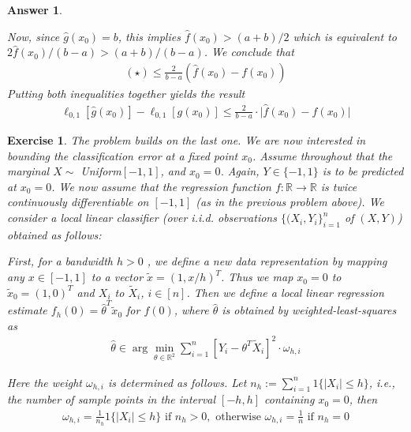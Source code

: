 \documentclass[12pt]{article}
\theoremstyle{colon}
\newtheorem{exercise}{Exercise}
\newtheorem*{answer}{Answer}
\begin{document}
\begin{answer}
\begin{enumerate}[label=\arabic*)]
      Now, since $\widehat{g}(x_0) = b$, this implies $\widehat{f}(x_0) > (a+b)/2$ which is equivalent to $2\widehat{f}(x_0)/(b-a) > (a+b)/(b-a)$. We conclude that
      \begin{gather*}
        (\star) \leq \frac{2}{b-a} (\widehat{f}(x_0) - f(x_0))
      \end{gather*}
      Putting both inequalities together yields the result
      \begin{gather*}
        \ell_{0,1}[\widehat{g}(x_0)] - \ell_{0,1}[g(x_0)] \leq \frac{2}{b-a} \cdot \lvert \widehat{f}(x_0) - f(x_0) \rvert
      \end{gather*}
  \end{enumerate}
\end{answer}

\clearpage

\begin{exercise}
  The problem builds on the last one. We are now interested in bounding the classification error at a fixed point $x_0$. Assume throughout that the marginal $X \sim$ Uniform$[-1,1]$, and $x_0 = 0$. Again, $Y \in \{-1, 1\}$ is to be predicted at $x_0 = 0$. We now assume that the regression function $f: \mathbb{R} \rightarrow \mathbb{R}$ is twice continuously differentiable on $[-1,1]$ (as in the previous problem above). We consider a \textit{local linear} classifier (over i.i.d. observations $\{(X_i, Y_i\}_{i=1}^n$ of $(X,Y)$) obtained as follows:

  First, for a bandwidth $h > 0$ , we define a new data representation by mapping any $x \in [-1,1]$ to a vector $\tilde{x} = (1, x/h)^T$. Thus we map $x_0 = 0$ to $\tilde{x}_0 = (1,0)^T$ and $X_i$ to $\tilde{X}_i$, $i \in [n]$. Then we define a local linear regression estimate $f_h(0) = \widehat{\theta}^T \tilde{x}_0$ for $f(0)$, where $\widehat{\theta}$ is obtained by weighted-least-squares as
  \begin{gather*}
    \widehat{\theta} \in \arg\min_{\theta \in \mathbb{R}^2} \sum_{i=1}^n [Y_i - \theta^T \tilde{X}_i]^2 \cdot \omega_{h,i}
  \end{gather*}

  Here the weight $\omega_{h,i}$ is determined as follows. Let $n_h := \sum_{i=1}^n 1\{ \lvert X_i \rvert \leq h \}$, i.e., the number of sample points in the interval $[-h,h]$ containing $x_0 = 0$, then
  \begin{gather*}
    \omega_{h,i} = \frac{1}{n_h} 1\{ \lvert X_i \rvert \leq h \} \text{ if } n_h > 0, \text{ otherwise } \omega_{h,i} = \frac{1}{n} \text{ if } n_h = 0
  \end{gather*}


\end{exercise}
\end{document}

